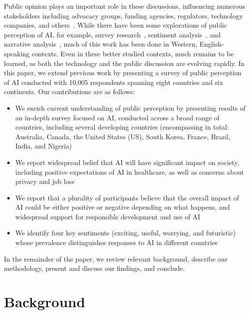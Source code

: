 \documentclass[sigconf]{acmart}
\begin{document}
Public opinion plays an important role in these discussions, influencing numerous stakeholders including advocacy groups, funding agencies, regulators, technology companies, and others~\cite{castro2019, cave2018portrayals}. While there have been some explorations of public perception of AI, for example, survey research~\cite{arm2017, blumberg2019, cave2019, ipsos2019, mozilla2019, northeastern2018, west2018, zhang2019artificial}, sentiment analysis~\cite{fast2017long, garvey2019sentiment}, and narrative analysis~\cite{cave2018portrayals}, much of this work has been done in Western, English-speaking contexts. Even in these better studied contexts, much remains to be learned, as both the technology and the public discussion are evolving rapidly. In this paper, we extend previous work by presenting a survey of public perception of AI conducted with 10,005 respondents spanning eight countries and six continents. Our contributions are as follows:

\begin{itemize}[leftmargin = 1.1em]
\item We enrich current understanding of public perception by presenting results of an in-depth survey focused on AI, conducted across a broad range of countries, including several developing countries (encompassing in total: Australia, Canada, the United States (US), South Korea, France, Brazil, India, and Nigeria)
\item We report widespread belief that AI will have significant impact on society, including positive expectations of AI in healthcare, as well as concerns about privacy and job loss
\item We report that a plurality of participants believe that the overall impact of AI could be either positive or negative depending on what happens, and widespread support for responsible development and use of AI
\item We identify four key sentiments (exciting, useful, worrying, and futuristic) whose prevalence distinguishes responses to AI in different countries
\end{itemize}

In the remainder of the paper, we review relevant background, describe our methodology, present and discuss our findings, and conclude. 
\section{Background}
\end{document}
